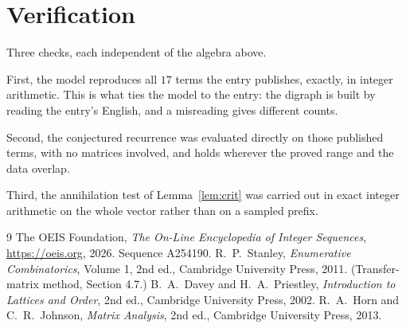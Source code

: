 \documentclass[11pt,a4paper]{article}
\theoremstyle{plain}
\theoremstyle{definition}
\begin{document}
\section{Verification}

Three checks, each independent of the algebra above.

First, the model reproduces all $17$ terms the entry publishes, exactly, in integer
arithmetic. This is what ties the model to the entry: the digraph is built by reading the
entry's English, and a misreading gives different counts.

Second, the conjectured recurrence was evaluated directly on those published terms, with no
matrices involved, and holds wherever the proved range and the data overlap.

Third, the annihilation test of Lemma~\ref{lem:crit} was carried out in exact integer
arithmetic on the whole vector rather than on a sampled prefix.

\begin{thebibliography}{9}
 The OEIS Foundation, \emph{The On-Line Encyclopedia of Integer
Sequences}, \url{https://oeis.org}, 2026. Sequence A254190.
 R.~P.~Stanley, \emph{Enumerative Combinatorics}, Volume 1, 2nd ed.,
Cambridge University Press, 2011. (Transfer-matrix method, Section 4.7.)
 B.~A.~Davey and H.~A.~Priestley, \emph{Introduction to Lattices and
Order}, 2nd ed., Cambridge University Press, 2002.
 R.~A.~Horn and C.~R.~Johnson, \emph{Matrix Analysis}, 2nd ed., Cambridge
University Press, 2013.
\end{thebibliography}
\end{document}
